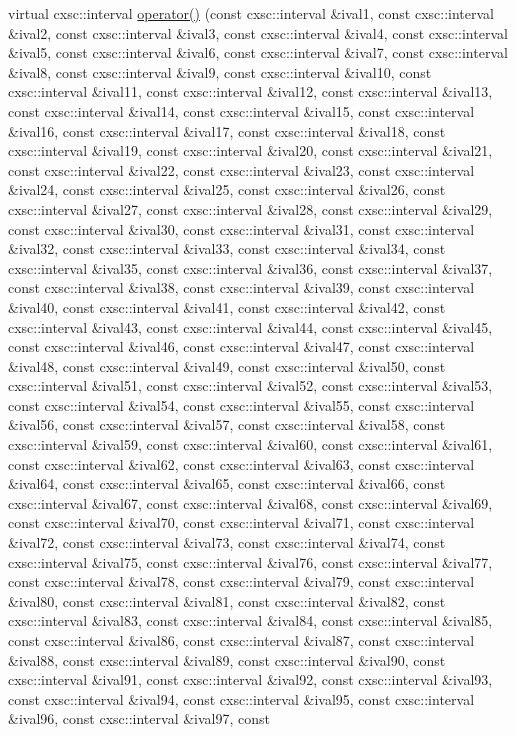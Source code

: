 \begin{DoxyCompactItemize}
virtual cxsc\-::interval \hyperlink{classRosenFobj100D_a6129ba2da54c28e00c0d41284a732af3}{operator()} (const cxsc\-::interval \&ival1, const cxsc\-::interval \&ival2, const cxsc\-::interval \&ival3, const cxsc\-::interval \&ival4, const cxsc\-::interval \&ival5, const cxsc\-::interval \&ival6, const cxsc\-::interval \&ival7, const cxsc\-::interval \&ival8, const cxsc\-::interval \&ival9, const cxsc\-::interval \&ival10, const cxsc\-::interval \&ival11, const cxsc\-::interval \&ival12, const cxsc\-::interval \&ival13, const cxsc\-::interval \&ival14, const cxsc\-::interval \&ival15, const cxsc\-::interval \&ival16, const cxsc\-::interval \&ival17, const cxsc\-::interval \&ival18, const cxsc\-::interval \&ival19, const cxsc\-::interval \&ival20, const cxsc\-::interval \&ival21, const cxsc\-::interval \&ival22, const cxsc\-::interval \&ival23, const cxsc\-::interval \&ival24, const cxsc\-::interval \&ival25, const cxsc\-::interval \&ival26, const cxsc\-::interval \&ival27, const cxsc\-::interval \&ival28, const cxsc\-::interval \&ival29, const cxsc\-::interval \&ival30, const cxsc\-::interval \&ival31, const cxsc\-::interval \&ival32, const cxsc\-::interval \&ival33, const cxsc\-::interval \&ival34, const cxsc\-::interval \&ival35, const cxsc\-::interval \&ival36, const cxsc\-::interval \&ival37, const cxsc\-::interval \&ival38, const cxsc\-::interval \&ival39, const cxsc\-::interval \&ival40, const cxsc\-::interval \&ival41, const cxsc\-::interval \&ival42, const cxsc\-::interval \&ival43, const cxsc\-::interval \&ival44, const cxsc\-::interval \&ival45, const cxsc\-::interval \&ival46, const cxsc\-::interval \&ival47, const cxsc\-::interval \&ival48, const cxsc\-::interval \&ival49, const cxsc\-::interval \&ival50, const cxsc\-::interval \&ival51, const cxsc\-::interval \&ival52, const cxsc\-::interval \&ival53, const cxsc\-::interval \&ival54, const cxsc\-::interval \&ival55, const cxsc\-::interval \&ival56, const cxsc\-::interval \&ival57, const cxsc\-::interval \&ival58, const cxsc\-::interval \&ival59, const cxsc\-::interval \&ival60, const cxsc\-::interval \&ival61, const cxsc\-::interval \&ival62, const cxsc\-::interval \&ival63, const cxsc\-::interval \&ival64, const cxsc\-::interval \&ival65, const cxsc\-::interval \&ival66, const cxsc\-::interval \&ival67, const cxsc\-::interval \&ival68, const cxsc\-::interval \&ival69, const cxsc\-::interval \&ival70, const cxsc\-::interval \&ival71, const cxsc\-::interval \&ival72, const cxsc\-::interval \&ival73, const cxsc\-::interval \&ival74, const cxsc\-::interval \&ival75, const cxsc\-::interval \&ival76, const cxsc\-::interval \&ival77, const cxsc\-::interval \&ival78, const cxsc\-::interval \&ival79, const cxsc\-::interval \&ival80, const cxsc\-::interval \&ival81, const cxsc\-::interval \&ival82, const cxsc\-::interval \&ival83, const cxsc\-::interval \&ival84, const cxsc\-::interval \&ival85, const cxsc\-::interval \&ival86, const cxsc\-::interval \&ival87, const cxsc\-::interval \&ival88, const cxsc\-::interval \&ival89, const cxsc\-::interval \&ival90, const cxsc\-::interval \&ival91, const cxsc\-::interval \&ival92, const cxsc\-::interval \&ival93, const cxsc\-::interval \&ival94, const cxsc\-::interval \&ival95, const cxsc\-::interval \&ival96, const cxsc\-::interval \&ival97, const 
\end{DoxyCompactItemize}
